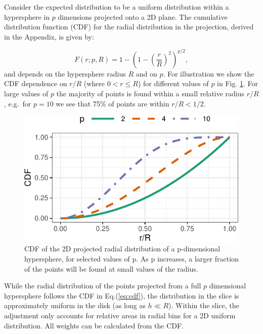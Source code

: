 \documentclass[]{interact}
\theoremstyle{plain}%
\theoremstyle{definition}
\theoremstyle{remark}
\begin{document}
Consider the expected distribution to be a uniform distribution within a
hypersphere in \(p\) dimensions projected onto a 2D plane. The
cumulative distribution function (CDF) for the radial distribution in
the projection, derived in the Appendix, is given by:

\begin{equation}
F(r;p,R) = 1-\left(1-\left(\frac{r}{R}\right)^2\right)^{p/2},
\label{eq:cdf}
\end{equation} and depends on the hypersphere radius \(R\) and on \(p\).
For illustration we show the CDF dependence on \(r/R\) (where
\(0<r\leq R\)) for different values of \(p\) in Fig. \ref{fig:cdf}. For
large values of \(p\) the majority of points is found within a small
relative radius \(r/R\), e.g.~for \(p=10\) we see that 75\% of points
are within \(r/R<1/2\).

\begin{figure}

{\centering \includegraphics[width=0.5\linewidth]{section_pursuit_files/figure-latex/cdf-1} 

}

\caption{CDF of the 2D projected radial distribution of a p-dimensional hypersphere, for selected values of p. As p increases, a larger fraction of the points will be found at small values of the radius.}\label{fig:cdf}
\end{figure}

While the radial distribution of the points projected from a full \(p\)
dimensional hypersphere follows the CDF in Eq.(\ref{eq:cdf}), the
distribution in the slice is approximately uniform in the disk (as long
as \(h \ll R\)). Within the slice, the adjustment only accounts for
relative areas in radial bins for a 2D uniform distribution. All weights
can be calculated from the CDF.
\end{document}
